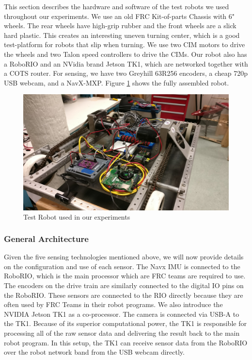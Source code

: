 \documentclass{article}
\begin{document}
			This section describes the hardware and software of the test robots we used throughout our experiments. We use an old FRC Kit-of-parts Chassis with 6" wheels. The rear wheels have high-grip rubber and the front wheels are a slick hard plastic. This creates an interesting uneven turning center, which is a good test-platform for robots that slip when turning. We use two CIM motors to drive the wheels and two Talon speed controllers to drive the CIMs. Our robot also has a RoboRIO and an NVidia brand Jetson TK1, which are networked together with a COTS router. For sensing, we have two Greyhill 63R256 encoders, a cheap 720p USB webcam, and a NavX-MXP. Figure \ref{fig:mocap_robot} shows the fully assembled robot.

			\begin{figure}[H]
				\centering
				\includegraphics[width=1\linewidth]{./images/mocap_robot.jpg}
				\caption{Test Robot used in our experiments}
				\label{fig:mocap_robot}
			\end{figure}

			\subsubsection{General Architecture}

			Given the five sensing technologies mentioned above, we will now provide details on the configuration and use of each sensor. The Navx IMU is connected to the RoboRIO, which is the main processor which are FRC teams are required to use. The encoders on the drive train are similarly connected to the digital IO pins on the RoboRIO. These sensors are connected to the RIO directly because they are often used by FRC Teams in their robot programs. We also introduce the NVIDIA Jetson TK1 as a co-processor. The camera is connected via USB-A to the TK1. Because of its superior computational power, the TK1 is responsible for processing all of the raw sensor data and delivering the result back to the main robot program. In this setup, the TK1 can receive sensor data from the RoboRIO over the robot network band from the USB webcam directly.
\end{document}
